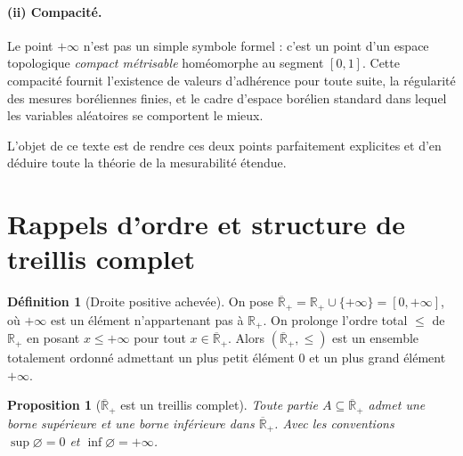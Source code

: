 \documentclass[11pt,a4paper]{article}
\theoremstyle{plain}
\newtheorem{proposition}[theorem]{Proposition}
\theoremstyle{definition}
\newtheorem{definition}[theorem]{Définition}
\newcommand{\Rp}{\mathbb{R}_+}
\newcommand{\Rpb}{\overline{\mathbb{R}}_+}
\begin{document}
\paragraph{(ii) Compacité.}
Le point $+\infty$ n'est pas un simple symbole formel : c'est un point d'un
espace topologique \emph{compact métrisable} homéomorphe au segment $[0,1]$.
Cette compacité fournit l'existence de valeurs d'adhérence pour toute suite,
la régularité des mesures boréliennes finies, et le cadre d'espace borélien
standard dans lequel les variables aléatoires se comportent le mieux.

L'objet de ce texte est de rendre ces deux points parfaitement explicites et
d'en déduire toute la théorie de la mesurabilité étendue.

\section{Rappels d'ordre et structure de treillis complet}

\begin{definition}[Droite positive achevée]
On pose $\Rpb=\Rp\cup\{+\infty\}=[0,+\infty]$, où $+\infty$ est un élément
n'appartenant pas à $\Rp$. On prolonge l'ordre total $\le$ de $\Rp$ en posant
$x\le+\infty$ pour tout $x\in\Rpb$. Alors $(\Rpb,\le)$ est un ensemble
totalement ordonné admettant un plus petit élément $0$ et un plus grand
élément $+\infty$.
\end{definition}

\begin{proposition}[$\Rpb$ est un treillis complet]\label{prop:treillis}
Toute partie $A\subseteq\Rpb$ admet une borne supérieure et une borne
inférieure dans $\Rpb$. Avec les conventions $\sup\varnothing=0$ et
$\inf\varnothing=+\infty$.
\end{proposition}
\end{document}
